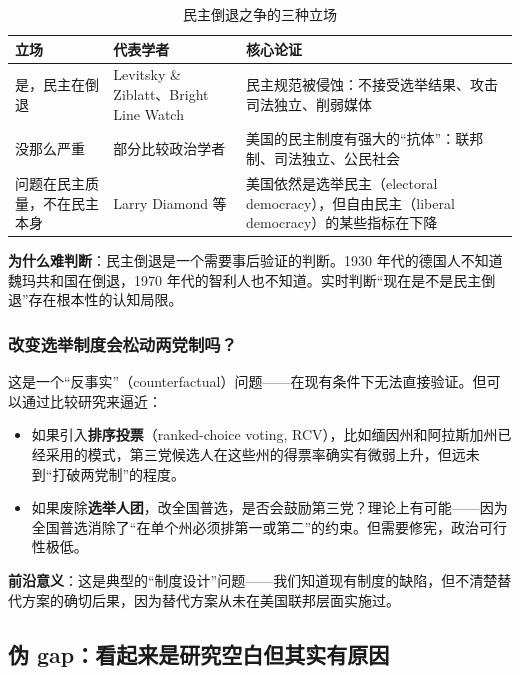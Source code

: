 \documentclass[12pt,a4paper]{ctexart}
\begin{document}
\begin{table}[h]
\centering
\caption{民主倒退之争的三种立场}
\begin{tabular}{@{}lp{3.6cm}p{8.6cm}@{}}
\toprule
\textbf{立场} & \textbf{代表学者} & \textbf{核心论证} \\
\midrule
是，民主在倒退 & Levitsky \& Ziblatt、Bright Line Watch & 民主规范被侵蚀：不接受选举结果、攻击司法独立、削弱媒体 \\
没那么严重 & 部分比较政治学者 & 美国的民主制度有强大的``抗体''：联邦制、司法独立、公民社会 \\
问题在民主质量，不在民主本身 & Larry Diamond 等 & 美国依然是选举民主（electoral democracy），但自由民主（liberal democracy）的某些指标在下降 \\
\bottomrule
\end{tabular}
\end{table}

\textbf{为什么难判断}：民主倒退是一个需要事后验证的判断。1930 年代的德国人不知道魏玛共和国在倒退，1970 年代的智利人也不知道。实时判断``现在是不是民主倒退''存在根本性的认知局限。

\subsubsection{改变选举制度会松动两党制吗？}

这是一个``反事实''（counterfactual）问题——在现有条件下无法直接验证。但可以通过比较研究来逼近：

\begin{itemize}
  \item 如果引入\textbf{排序投票}（ranked-choice voting, RCV），比如缅因州和阿拉斯加州已经采用的模式，第三党候选人在这些州的得票率确实有微弱上升，但远未到``打破两党制''的程度。
  \item 如果废除\textbf{选举人团}，改全国普选，是否会鼓励第三党？理论上有可能——因为全国普选消除了``在单个州必须排第一或第二''的约束。但需要修宪，政治可行性极低。
\end{itemize}

\textbf{前沿意义}：这是典型的``制度设计''问题——我们知道现有制度的缺陷，但不清楚替代方案的确切后果，因为替代方案从未在美国联邦层面实施过。

\subsection{伪 gap：看起来是研究空白但其实有原因}
\end{document}
